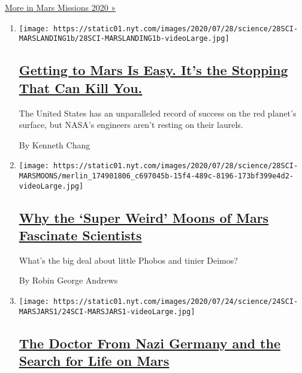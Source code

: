 \href{/news-event/summer-of-mars}{More in Mars Missions 2020 »}

\begin{enumerate}
\def\labelenumi{\arabic{enumi}.}
\item
  \texttt{[image: https://static01.nyt.com/images/2020/07/28/science/28SCI-MARSLANDING1b/28SCI-MARSLANDING1b-videoLarge.jpg]}

  \hypertarget{getting-to-mars-is-easy-its-the-stopping-that-can-kill-you}{%
  \subsection{\texorpdfstring{\href{/2020/07/29/science/nasa-mars-perseverance-rover.html}{Getting
  to Mars Is Easy. It's the Stopping That Can Kill
  You.}}{Getting to Mars Is Easy. It's the Stopping That Can Kill You.}}\label{getting-to-mars-is-easy-its-the-stopping-that-can-kill-you}}

  The United States has an unparalleled record of success on the red
  planet's surface, but NASA's engineers aren't resting on their
  laurels.

  By Kenneth Chang
\item
  \texttt{[image: https://static01.nyt.com/images/2020/07/28/science/28SCI-MARSMOONS/merlin\_174901806\_c697045b-15f4-489c-8196-173bf399e4d2-videoLarge.jpg]}

  \hypertarget{why-the-super-weird-moons-of-mars-fascinate-scientists}{%
  \subsection{\texorpdfstring{\href{/2020/07/25/science/mars-moons-phobos-deimos.html}{Why
  the `Super Weird' Moons of Mars Fascinate
  Scientists}}{Why the `Super Weird' Moons of Mars Fascinate Scientists}}\label{why-the-super-weird-moons-of-mars-fascinate-scientists}}

  What's the big deal about little Phobos and tinier Deimos?

  By Robin George Andrews
\item
  \texttt{[image: https://static01.nyt.com/images/2020/07/24/science/24SCI-MARSJARS1/24SCI-MARSJARS1-videoLarge.jpg]}

  \hypertarget{the-doctor-from-nazi-germany-and-the-search-for-life-on-mars}{%
  \subsection{\texorpdfstring{\href{/2020/07/24/science/mars-jars-strughold.html}{The
  Doctor From Nazi Germany and the Search for Life on
  Mars}}{The Doctor From Nazi Germany and the Search for Life on Mars}}\label{the-doctor-from-nazi-germany-and-the-search-for-life-on-mars}}


\end{enumerate}
